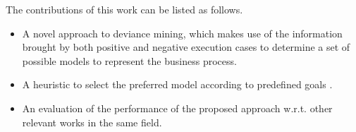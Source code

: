 
The contributions of this work can be listed as follows.
\begin{itemize}
\item A novel approach to deviance mining, which makes use of the information brought by both positive and negative execution cases to determine a set of possible models to represent the business process.
\item A heuristic to select the preferred model according to predefined goals .
\item An evaluation of the performance of the proposed approach w.r.t. other relevant works in the same field.
\end{itemize}



